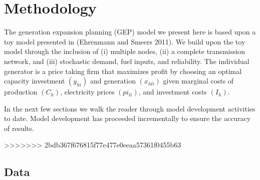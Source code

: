 \documentclass[10pt]{amsart}
\begin{document}
\section{Methodology}
The generation expansion planning (GEP) model we present here is based upon a toy model presented in (Ehrenmann and Smeers 2011). We build upon the toy model through the inclusion of (i) multiple nodes, (ii) a complete transmission network, and (iii) stochastic demand, fuel inputs, and reliability. 
The individual generator is a price taking firm that maximizes profit by choosing an optimal capacity investment $(y_{hi})$ and generation $(x_{hli})$ given marginal costs of production $(C_h)$, electricity prices $(pi_{li})$, and investment costs $(I_{h})$.

In the next few sections we walk the reader through model development activities to date. 
Model development has proceeded incrementally to ensure the accuracy of results. 

>>>>>>> 2bdb367f676815f77e477e0eeaa57361f0455b63

	
	
	
	
	
	
	
		
\subsection{Data}	
\end{document}
